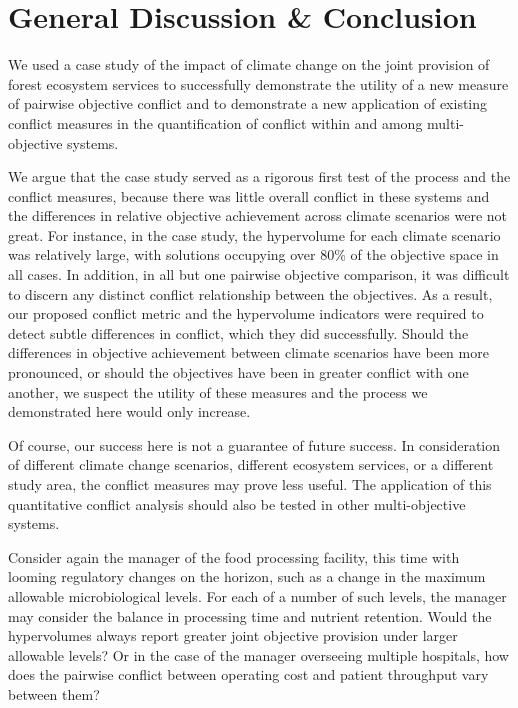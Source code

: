 \section{General Discussion \& Conclusion}
We used a case study of the impact of climate change on the joint provision of forest ecosystem services to successfully demonstrate the utility of a new measure of pairwise objective conflict and to demonstrate a new application of existing conflict measures in the quantification of conflict within and among multi-objective systems.

We argue that the case study served as a rigorous first test of the process and the conflict measures, because there was little overall conflict in these systems and the differences in relative objective achievement across climate scenarios were not great. For instance, in the case study, the hypervolume for each climate scenario was relatively large, with solutions occupying over 80\% of the objective space in all cases. In addition, in all but one pairwise objective comparison, it was difficult to discern any distinct conflict relationship between the objectives. As a result, our proposed conflict metric and the hypervolume indicators were required to detect subtle differences in conflict, which they did successfully. Should the differences in objective achievement between climate scenarios have been more pronounced, or should the objectives have been in greater conflict with one another, we suspect the utility of these measures and the process we demonstrated here would only increase.

Of course, our success here is not a guarantee of future success. In consideration of different climate change scenarios, different ecosystem services, or a different study area, the conflict measures may prove less useful. The application of this quantitative conflict analysis should also be tested in other multi-objective systems.

Consider again the manager of the food processing facility, this time with looming regulatory changes on the horizon, such as a change in the maximum allowable microbiological levels. For each of a number of such levels, the manager may consider the balance in processing time and nutrient retention. Would the hypervolumes always report greater joint objective provision under larger allowable levels? Or in the case of the manager overseeing multiple hospitals, how does the pairwise conflict between operating cost and patient throughput vary between them?

